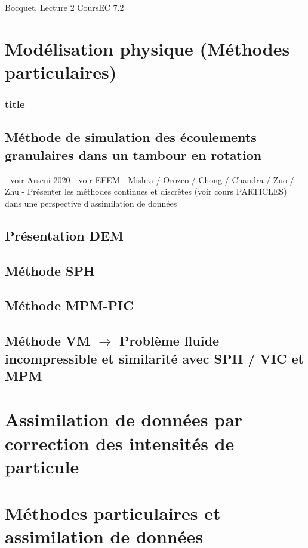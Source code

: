 \documentclass{article}
\begin{document}
Bocquet, Lecture 2
CoursEC 7.2

\section{Modélisation physique (Méthodes particulaires)}
\subsubsection*{title}
\subsection{Méthode de simulation des écoulements granulaires dans un tambour en rotation}

- voir Arseni 2020
- voir EFEM
- Mishra / Orozco / Chong / Chandra / Zuo / Zhu
- Présenter les méthodes continues et discrètes (voir cours PARTICLES) dans une perspective d'assimilation de données

\subsection{Présentation DEM}

\subsection{Méthode SPH}
\subsection{Méthode MPM-PIC}
\subsection{Méthode VM $\rightarrow$ Problème fluide incompressible et similarité avec SPH / VIC et MPM}

\section{Assimilation de données par correction des intensités de particule}

\section{Méthodes particulaires et assimilation de données}
\end{document}
